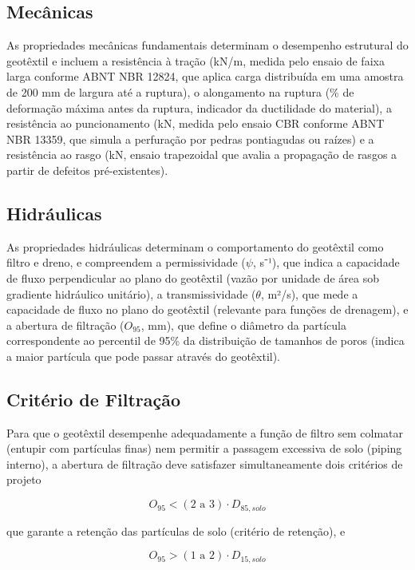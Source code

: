 \documentclass[
  portuguese,
  11pt,
  a4paper,
  open=any]{scrbook}
\begin{document}
\subsection{Mecânicas}\label{mecuxe2nicas}

As propriedades mecânicas fundamentais determinam o desempenho
estrutural do geotêxtil e incluem a resistência à tração (kN/m, medida
pelo ensaio de faixa larga conforme ABNT NBR 12824, que aplica carga
distribuída em uma amostra de 200 mm de largura até a ruptura), o
alongamento na ruptura (\% de deformação máxima antes da ruptura,
indicador da ductilidade do material), a resistência ao puncionamento
(kN, medida pelo ensaio CBR conforme ABNT NBR 13359, que simula a
perfuração por pedras pontiagudas ou raízes) e a resistência ao rasgo
(kN, ensaio trapezoidal que avalia a propagação de rasgos a partir de
defeitos pré-existentes).

\subsection{Hidráulicas}\label{hidruxe1ulicas}

As propriedades hidráulicas determinam o comportamento do geotêxtil como
filtro e dreno, e compreendem a permissividade (\(\psi\), s⁻¹), que
indica a capacidade de fluxo perpendicular ao plano do geotêxtil (vazão
por unidade de área sob gradiente hidráulico unitário), a
transmissividade (\(\theta\), m²/s), que mede a capacidade de fluxo no
plano do geotêxtil (relevante para funções de drenagem), e a abertura de
filtração (\(O_{95}\), mm), que define o diâmetro da partícula
correspondente ao percentil de 95\% da distribuição de tamanhos de poros
(indica a maior partícula que pode passar através do geotêxtil).

\subsection{Critério de Filtração}\label{crituxe9rio-de-filtrauxe7uxe3o}

Para que o geotêxtil desempenhe adequadamente a função de filtro sem
colmatar (entupir com partículas finas) nem permitir a passagem
excessiva de solo (piping interno), a abertura de filtração deve
satisfazer simultaneamente dois critérios de projeto

\[
O_{95} < (2 \text{ a } 3) \cdot D_{85,solo}
\]

que garante a retenção das partículas de solo (critério de retenção), e

\[
O_{95} > (1 \text{ a } 2) \cdot D_{15,solo}
\]
\end{document}
